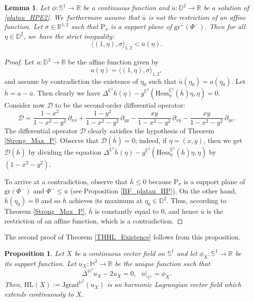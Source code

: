 \documentclass[JEP,XML,SOM,Unicode,NoEqCountersInSection, NoFloatCountersInSection,published]{cedram}
\theoremstyle{plain}
\newtheorem{prop}[cor]{Proposition}
\newtheorem{lemma}[cor]{Lemma}
\theoremstyle{definition}
\newcommand{\minko}{\mathbb{R}^{1,2}}
\newcommand{\grad}{\mathrm{grad}^{\mathbb{H}^2}}
\newcommand{\J}{\mathrm{J}}
\begin{document}
\begin{lemma}\label{mean_up_convex_core}
Let $\phi: \mathbb{S}^1 \to \mathbb{R}$ be a continuous function and $\overline{u}: \mathbb{D}^2 \to \mathbb{R}$ be a solution of \eqref{platau_HPE2}. We~furthermore assume that $\overline{u}$ is not the restriction of an affine function. Let $\sigma \in \minko$ such that $\mathrm{P}_{\sigma}$ is a support plane of $\mathrm{gr}^+(\Phi^-)$. Then for all $\eta \in \mathbb{D}^2$, we~have the strict inequality:
\[
\langle (1,\eta), \sigma \rangle_{1,2} < \overline{u}(\eta).
\]
\end{lemma}

\begin{proof}
Let $a: \mathbb{D}^2 \to \mathbb{R}$ be the affine function given by
\[
a(\eta) = \langle (1,\eta), \sigma \rangle_{1,2},
\]
and assume by contradiction the existence of $\eta_0$ such that $\overline{u}(\eta_0) = a(\eta_0)$. Let $\overline{h} = a - \overline{u}$. Then clearly we have $\Delta^{\mathbb{E}^2}\overline{h}(\eta) - g^{\mathbb{E}^2}(\mathrm{Hess}^{\mathbb{E}^2}_\eta(\overline{h})\eta, \eta) = 0$.\\
Consider now $\mathcal{D}$ to be the second-order differential operator:
\begin{equation}\label{strictelliptic}
\mathcal{D} = \frac{1-x^2}{1-x^2-y^2}\,\partial_{xx} + \frac{1-y^2}{1-x^2-y^2}\,\partial_{yy} - \frac{xy}{1-x^2-y^2}\,\partial_{xy} - \frac{xy}{1-x^2-y^2}\,\partial_{yx}.
\end{equation}
The differential operator $\mathcal{D}$ clearly satisfies the hypothesis of Theorem \ref{Strong_Max_P}. Observe that $\mathcal{D}(\overline{h}) = 0$; indeed, if $\eta = (x,y)$, then we get $\mathcal{D}(\overline{h})$ by dividing the equation $\Delta^{\mathbb{E}^2}\overline{h}(\eta) - g^{\mathbb{E}^2}(\mathrm{Hess}^{\mathbb{E}^2}_\eta(\overline{h})\eta, \eta)$ by $(1-x^2-y^2)$.

To arrive at a contradiction, observe that $\overline{h} \leq 0$ because $\mathrm{P}_{\sigma}$ is a support plane of $\mathrm{gr}(\Phi^-)$ and $\Phi^- \leq \overline{u}$ (see Proposition \ref{BF_platau_HP}). On the other hand, $\overline{h}(\eta_0) = 0$ and so $\overline{h}$ achieves its maximum at $\eta_0 \in \mathbb{D}^2$. Thus, according to Theorem \ref{Strong_Max_P}, $\overline{h}$ is constantly equal to $0$, and hence $\overline{u}$ is the restriction of an affine function, which is a contradiction.
\end{proof}
The second proof of Theorem \ref{THHL_Existence} follows from this proposition.
\begin{prop}\label{second_proof}
Let $X$ be a continuous vector field on $\mathbb{S}^1$ and let $\phi_X:\mathbb{S}^1\to\mathbb{R}$ be its support function. Let $u_X:\mathbb{H}^2\to\mathbb{R}$ be the unique function such that \begin{equation}\label{platau_HP_proof}
\Delta^{\mathbb{H}^2} u_X-2u_X=0 ,\ \ \ \overline{u}|_{\mathbb{S}^1}=\phi_X.
\end{equation}
Then, $\mathrm{HL}(X):=\J\grad(u_X)$ is an harmonic Lagrangian vector field which extends continuously to $X$.
\end{prop}
\end{document}
